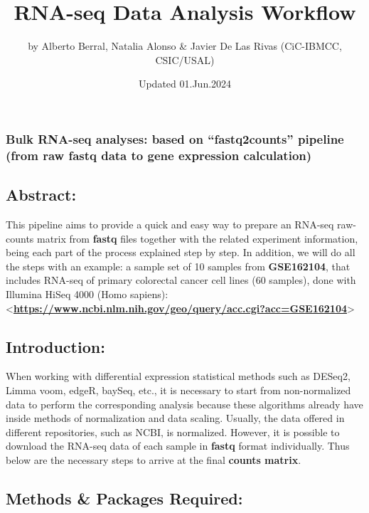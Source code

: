 \documentclass[
]{article}
\title{RNA-seq Data Analysis Workflow}
\author{by Alberto Berral, Natalia Alonso \& Javier De Las Rivas
(CiC-IBMCC, CSIC/USAL)}
\date{Updated 01.Jun.2024}
\begin{document}
\maketitle

\subsubsection{Bulk RNA-seq analyses: based on ``fastq2counts'' pipeline
(from raw fastq data to gene expression
calculation)}\label{bulk-rna-seq-analyses-based-on-fastq2counts-pipeline-from-raw-fastq-data-to-gene-expression-calculation}

\subsection{Abstract:}\label{abstract}

This pipeline aims to provide a quick and easy way to prepare an RNA-seq
raw-counts matrix from \textbf{fastq} files together with the related
experiment information, being each part of the process explained step by
step. In addition, we will do all the steps with an example: a sample
set of 10 samples from \textbf{GSE162104}, that includes RNA-seq of
primary colorectal cancer cell lines (60 samples), done with Illumina
HiSeq 4000 (Homo sapiens):
\textless{}\textbf{\url{https://www.ncbi.nlm.nih.gov/geo/query/acc.cgi?acc=GSE162104}}\textgreater{}

\subsection{Introduction:}\label{introduction}

When working with differential expression statistical methods such as
DESeq2, Limma voom, edgeR, baySeq, etc., it is necessary to start from
non-normalized data to perform the corresponding analysis because these
algorithms already have inside methods of normalization and data
scaling. Usually, the data offered in different repositories, such as
NCBI, is normalized. However, it is possible to download the RNA-seq
data of each sample in \textbf{fastq} format individually. Thus below
are the necessary steps to arrive at the final \textbf{counts matrix}.

\subsection{Methods \& Packages
Required:}\label{methods-packages-required}
\end{document}
